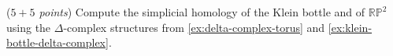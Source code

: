 \begin{sheetexercise} (\textit{$5+5$ points})
	Compute the simplicial homology of the Klein bottle and of $\mathbb{RP}^2$ using the $\Delta$-complex structures from \autoref{ex:delta-complex-torus} and \autoref{ex:klein-bottle-delta-complex}.
\end{sheetexercise}


